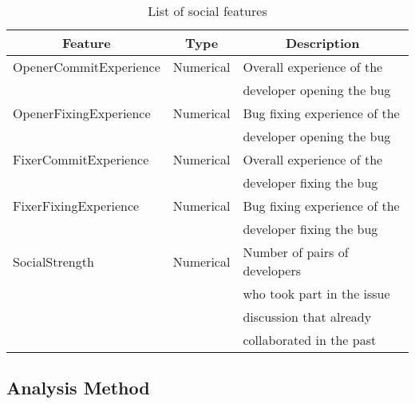 \documentclass[sigconf,review]{acmart}
\begin{document}
\begin{table}
\caption{List of social features} \label{tabel:social}
\begin{tabular}{lll}
\hline
\hline
\multicolumn{1}{c}{Feature}
& \multicolumn{1}{c}{Type}
&	\multicolumn{1}{c}{Description}    \\    

\hline
   OpenerCommitExperience & Numerical & Overall experience of the \\&& developer opening the bug \\     
   OpenerFixingExperience & Numerical & Bug fixing experience of the \\&& developer opening the bug \\
   FixerCommitExperience & Numerical & Overall experience of the \\&& developer fixing the bug\\
   FixerFixingExperience & Numerical & Bug fixing experience of the \\&& developer fixing the bug\\
   SocialStrength 		 & Numerical & Number of pairs of developers \\&&who took part in the issue \\&&discussion that already \\&&collaborated in the past\\


\hline
\hline
\end{tabular}
\end{table}

\subsection{Analysis Method}


\end{document}

